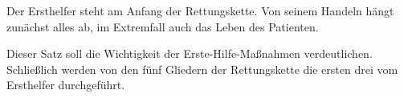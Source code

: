 % 
% 
%     
% 
% 
% 
% 
% 


Der Ersthelfer steht am Anfang der Rettungskette. Von seinem Handeln hängt 
zunächst alles ab, im Extremfall auch das Leben des Patienten.



Dieser Satz soll  die Wichtigkeit der Erste-Hilfe-Maßnahmen
verdeutlichen. Schließlich werden von den fünf Gliedern der
Rettungskette die ersten drei vom Ersthelfer durchgeführt.


